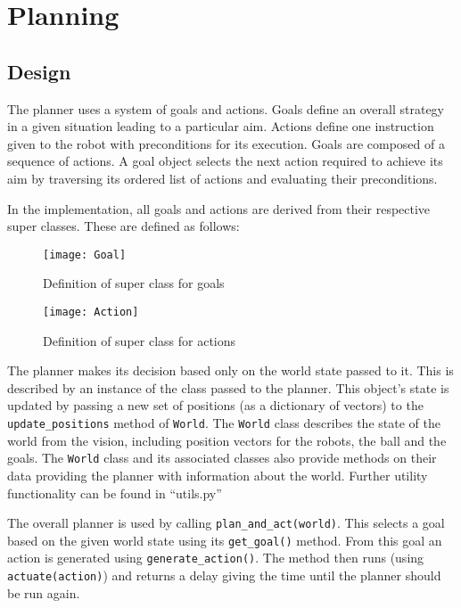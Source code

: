 \section{Planning}
\lstset{language=Python, showstringspaces=false}


\subsection{Design}

The planner uses a system of goals and actions. Goals define an overall strategy in a given situation leading to a particular aim. Actions define one instruction given to the robot with preconditions for its execution. Goals are composed of a sequence of actions. A goal object selects the next action required to achieve its aim by traversing its ordered list of actions and evaluating their preconditions.

In the implementation, all goals and actions are derived from their respective super classes. These are defined as follows:

\begin{figure}[H]
	\centering
    \texttt{[image: Goal]}
    \caption{Definition of super class for goals}
\end{figure}


\begin{figure}[H]
	\centering
    \texttt{[image: Action]}
    \caption{Definition of super class for actions}
\end{figure}


The planner makes its decision based only on the world state passed to it. This is described by an instance of the  class passed to the planner. This object's state is updated by passing a new set of positions (as a dictionary of vectors) to the \texttt{update\_positions} method of \texttt{World}. The \texttt{World} class describes the state of the world from the vision, including position vectors for the robots, the ball and the goals. The \texttt{World} class and its associated classes also provide methods on their data providing the planner with information about the world. Further utility functionality can be found in ``utils.py''

The overall planner is used by calling \texttt{plan\_and\_act(world)}.
This selects a goal based on the given world state  using its \texttt{get\_goal()} method. From this goal an action is generated using \texttt{generate\_action()}. The method then runs (using \texttt{actuate(action)}) and returns a delay giving the time until the planner should be run again.

